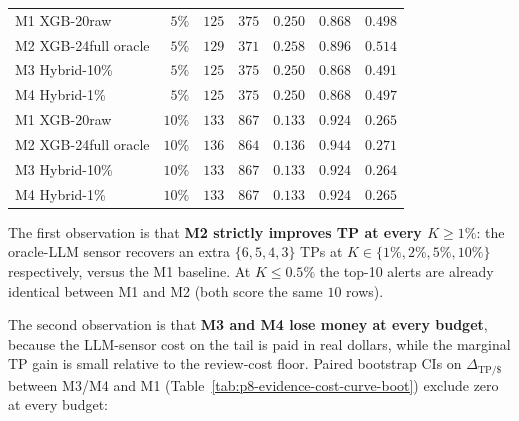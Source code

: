 \documentclass{article}
\providecommand{\tableref}[1]{Table~\ref{#1}}
\begin{document}
\begin{table}[t]
\begin{tabular}{lrrrrrr}
\midrule
M1 XGB-20raw           & $5\%$   & $125$ & $375$ & $0.250$ & $0.868$ & $0.498$ \\
M2 XGB-24full oracle   & $5\%$   & $129$ & $371$ & $0.258$ & $0.896$ & $0.514$ \\
M3 Hybrid-10\%         & $5\%$   & $125$ & $375$ & $0.250$ & $0.868$ & $0.491$ \\
M4 Hybrid-1\%          & $5\%$   & $125$ & $375$ & $0.250$ & $0.868$ & $0.497$ \\
\midrule
M1 XGB-20raw           & $10\%$  & $133$ & $867$ & $0.133$ & $0.924$ & $0.265$ \\
M2 XGB-24full oracle   & $10\%$  & $136$ & $864$ & $0.136$ & $0.944$ & $0.271$ \\
M3 Hybrid-10\%         & $10\%$  & $133$ & $867$ & $0.133$ & $0.924$ & $0.264$ \\
M4 Hybrid-1\%          & $10\%$  & $133$ & $867$ & $0.133$ & $0.924$ & $0.265$ \\
\bottomrule
\end{tabular}
\end{table}

The first observation is that \textbf{M2 strictly improves TP at every
$K \ge 1\%$}: the oracle-LLM sensor recovers an extra
$\{6, 5, 4, 3\}$ TPs at $K \in \{1\%, 2\%, 5\%, 10\%\}$ respectively,
versus the M1 baseline. At $K \le 0.5\%$ the top-10 alerts are already
identical between M1 and M2 (both score the same $10$ rows).

The second observation is that \textbf{M3 and M4 lose money at every
budget}, because the LLM-sensor cost on the tail is paid in real
dollars, while the marginal TP gain is small relative to the review-cost
floor. Paired bootstrap CIs on $\Delta_{\text{TP}/\$}$ between M3/M4 and
M1 (\tableref{tab:p8-evidence-cost-curve-boot}) exclude zero at every
budget:
\end{document}
